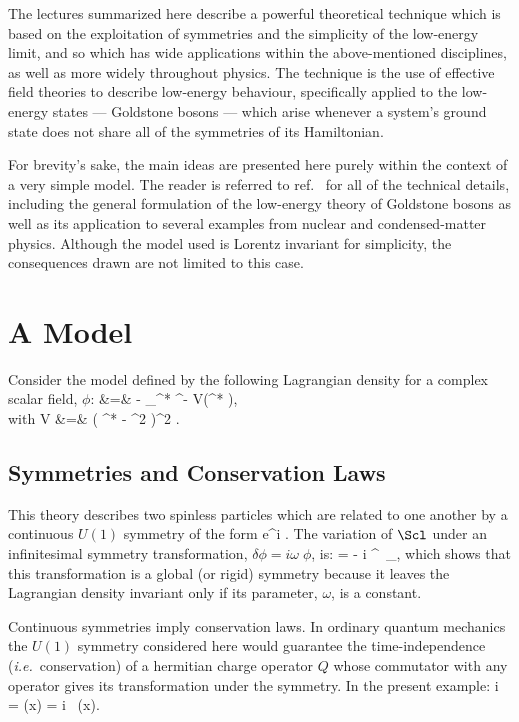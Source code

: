\documentclass[12pt]{article}
\def\ie{{\it i.e.\/}}
\def\nn{\nonumber}
\begin{document}
The lectures summarized here describe a powerful theoretical 
technique which is based on the exploitation of symmetries 
and the simplicity of the low-energy limit, and so which has 
wide applications within the above-mentioned disciplines, as 
well as more widely throughout physics. The technique is the
use of effective field theories to describe low-energy behaviour,
specifically applied to the low-energy states --- Goldstone 
bosons --- which arise whenever a system's ground state
does not share all of the symmetries of its Hamiltonian.

For brevity's sake, the main ideas are presented here purely
within the context of a very simple model. The reader is
referred to ref.~\cite{Burgess98a} for all of the technical
details, including the general formulation of the low-energy
theory of Goldstone bosons as well as its application to
several examples from nuclear and condensed-matter physics. 
Although the model used is Lorentz invariant for simplicity,
the consequences drawn are not limited to this case.

\section{A Model}

Consider the model defined by the following Lagrangian density
for a complex scalar field, $\phi$:
%
\bg
\label{abeltoymodel}
\Scl &=& - \partial_\mu \phi^* \partial^\mu \phi - V(\phi^* \phi), \nn\\
\hbox{with} \qquad V &=& {\lambda {}} \; \left( \phi^* \phi - {\mu^2
\over \lambda} \right)^2 .
\nd

\subsection{Symmetries and Conservation Laws}

This theory describes two spinless particles which are related to
one another by a continuous $U(1)$ symmetry of the form 
%
\bg
\label{U1form}
\phi \to e^{i\omega} \; \phi. 
\nd 
%
The variation of $\Scl$ 
under an infinitesimal symmetry transformation, $\delta \phi
= i \omega \; \phi$,  is:
%
\bg
\label{deltaL}
\delta \Scl = - i \partial^\mu \phi \, \partial_\mu \omega, 
\nd
%
which shows that this transformation is a global
(or rigid) symmetry because it leaves the Lagrangian density 
invariant only if its parameter, $\omega$, is a constant. 

Continuous symmetries imply conservation laws. In ordinary
quantum mechanics the $U(1)$ symmetry considered here
would guarantee the time-independence (\ie\ conservation) 
of a hermitian charge operator $Q$ whose commutator with any operator
gives its transformation under the symmetry. In the present example:
%
\bg
\label{generator}
i \omega {} = \delta \phi(x) = i \omega \, \phi(x).
\nd
\end{document}
